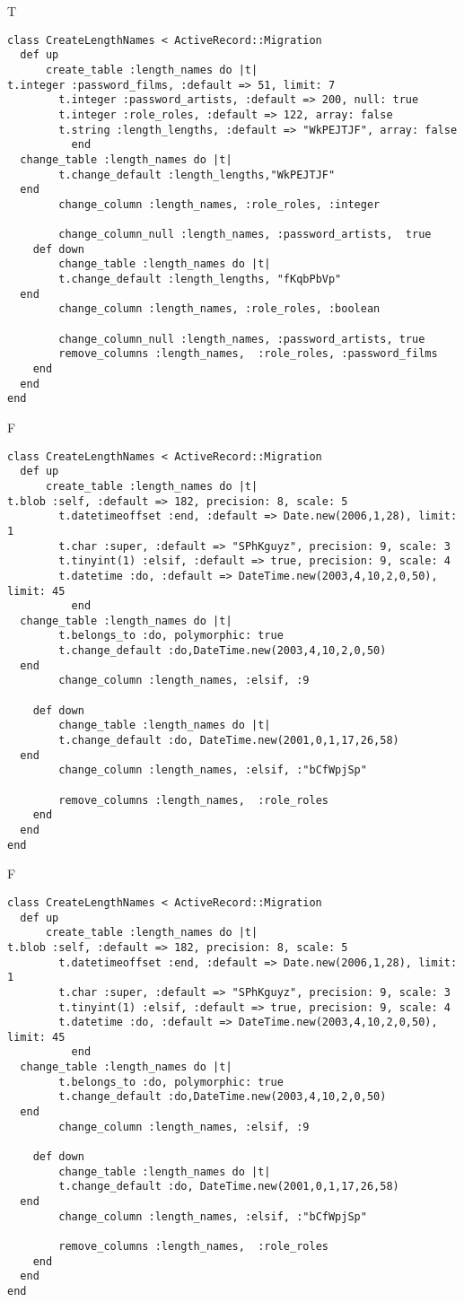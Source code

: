 T
\begin{verbatim}
class CreateLengthNames < ActiveRecord::Migration
  def up
	  create_table :length_names do |t|
t.integer :password_films, :default => 51, limit: 7
		t.integer :password_artists, :default => 200, null: true
		t.integer :role_roles, :default => 122, array: false
		t.string :length_lengths, :default => "WkPEJTJF", array: false
		  end
  change_table :length_names do |t|
		t.change_default :length_lengths,"WkPEJTJF"
  end
 		change_column :length_names, :role_roles, :integer
   
		change_column_null :length_names, :password_artists,  true
	def down
		change_table :length_names do |t|
		t.change_default :length_lengths, "fKqbPbVp"
  end
 		change_column :length_names, :role_roles, :boolean
   
		change_column_null :length_names, :password_artists, true
 		remove_columns :length_names,  :role_roles, :password_films 
    end 
  end
end

\end{verbatim}

F
\begin{verbatim}
class CreateLengthNames < ActiveRecord::Migration
  def up
	  create_table :length_names do |t|
t.blob :self, :default => 182, precision: 8, scale: 5
		t.datetimeoffset :end, :default => Date.new(2006,1,28), limit: 1
		t.char :super, :default => "SPhKguyz", precision: 9, scale: 3
		t.tinyint(1) :elsif, :default => true, precision: 9, scale: 4
		t.datetime :do, :default => DateTime.new(2003,4,10,2,0,50), limit: 45
		  end
  change_table :length_names do |t|
		t.belongs_to :do, polymorphic: true
 		t.change_default :do,DateTime.new(2003,4,10,2,0,50)
  end
 		change_column :length_names, :elsif, :9
   
	def down
		change_table :length_names do |t|
		t.change_default :do, DateTime.new(2001,0,1,17,26,58)
  end
 		change_column :length_names, :elsif, :"bCfWpjSp"
   
		remove_columns :length_names,  :role_roles 
    end 
  end
end

\end{verbatim}

F
\begin{verbatim}
class CreateLengthNames < ActiveRecord::Migration
  def up
	  create_table :length_names do |t|
t.blob :self, :default => 182, precision: 8, scale: 5
		t.datetimeoffset :end, :default => Date.new(2006,1,28), limit: 1
		t.char :super, :default => "SPhKguyz", precision: 9, scale: 3
		t.tinyint(1) :elsif, :default => true, precision: 9, scale: 4
		t.datetime :do, :default => DateTime.new(2003,4,10,2,0,50), limit: 45
		  end
  change_table :length_names do |t|
		t.belongs_to :do, polymorphic: true
 		t.change_default :do,DateTime.new(2003,4,10,2,0,50)
  end
 		change_column :length_names, :elsif, :9
   
	def down
		change_table :length_names do |t|
		t.change_default :do, DateTime.new(2001,0,1,17,26,58)
  end
 		change_column :length_names, :elsif, :"bCfWpjSp"
   
		remove_columns :length_names,  :role_roles 
    end 
  end
end

\end{verbatim}

